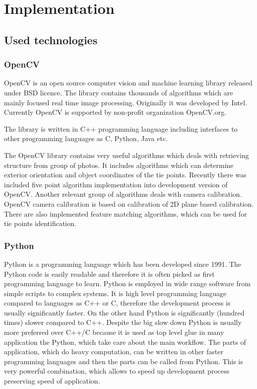 \documentclass[a4paper,12pt]{article}
\begin{document}
\section{Implementation}

\subsection{Used technologies}

\subsubsection{OpenCV}


OpenCV is an open source computer vision and machine learning library released under BSD licence.
The library contains thousands of algorithms which are mainly focused real time image processing.
Originally it was developed by Intel. Currently OpenCV is supported by non-profit organization OpenCV.org.

The library is written in C++ programming language including interfaces to other programming languages as C, Python, Java etc. 

The OpenCV library contains very useful algorithms which deals with retrieving structure from group 
of photos. It includes algorithms which can determine exterior orientation 
and object coordinates of the tie points.
Recently there was included five point algorithm implementation into development version of OpenCV.
Another relevant group of algorithms deals with camera calibration. OpenCV  camera calibration
is based on calibration of 2D plane based calibration.  
There are also implemented feature matching algorithms, which can be used for tie points identification. 


\subsubsection{Python}

Python is a programming language which has been developed since 1991. 
The Python code is easily readable and therefore it is often picked as first programming
language to learn. Python is employed in wide range software from simple scripts to complex systems.
It is high level programming language compared to languages as C++ or C, therefore 
the development process is usually significantly faster. On the other hand 
Python is significantly (hundred times) slower compared to C++. Despite the big 
slow down Python is usually more preferred over C++/C because 
it is used as top level glue in many application the Python, which take care about 
the main workflow. The parts of application, which do heavy computation, can 
be written in other faster programming languages and then the parts can be called 
from Python. This is very powerful combination, which allows to speed up development 
process preserving speed of application.
\end{document}
